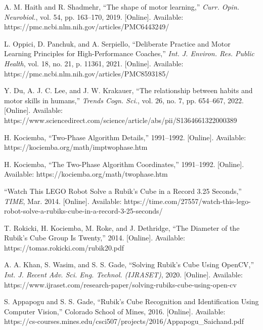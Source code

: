 
 \nocite{*}
 

\begin{thebibliography}{14}

A. M. Haith and R. Shadmehr, ``The shape of motor learning,'' \textit{Curr. Opin. Neurobiol.}, vol. 54, pp. 163--170, 2019. [Online]. Available: https://pmc.ncbi.nlm.nih.gov/articles/PMC6443249/

L. Oppici, D. Panchuk, and A. Serpiello, ``Deliberate Practice and Motor Learning Principles for High-Performance Coaches,'' \textit{Int. J. Environ. Res. Public Health}, vol. 18, no. 21, p. 11361, 2021. [Online]. Available: https://pmc.ncbi.nlm.nih.gov/articles/PMC8593185/

Y. Du, A. J. C. Lee, and J. W. Krakauer, ``The relationship between habits and motor skills in humans,'' \textit{Trends Cogn. Sci.}, vol. 26, no. 7, pp. 654--667, 2022. [Online]. Available: https://www.sciencedirect.com/science/article/abs/pii/S1364661322000389

H. Kociemba, ``Two-Phase Algorithm Details,'' 1991--1992. [Online]. Available: https://kociemba.org/math/imptwophase.htm

H. Kociemba, ``The Two-Phase Algorithm Coordinates,'' 1991--1992. [Online]. Available: https://kociemba.org/math/twophase.htm

``Watch This LEGO Robot Solve a Rubik's Cube in a Record 3.25 Seconds,'' \textit{TIME}, Mar. 2014. [Online]. Available: https://time.com/27557/watch-this-lego-robot-solve-a-rubiks-cube-in-a-record-3-25-seconds/

T. Rokicki, H. Kociemba, M. Roke, and J. Dethridge, ``The Diameter of the Rubik's Cube Group Is Twenty,'' 2014. [Online]. Available: https://tomas.rokicki.com/rubik20.pdf

A. A. Khan, S. Wasim, and S. S. Gade, ``Solving Rubik's Cube Using OpenCV,'' \textit{Int. J. Recent Adv. Sci. Eng. Technol. (IJRASET)}, 2020. [Online]. Available: https://www.ijraset.com/research-paper/solving-rubiks-cube-using-open-cv

S. Appapogu and S. S. Gade, ``Rubik's Cube Recognition and Identification Using Computer Vision,'' Colorado School of Mines, 2016. [Online]. Available: https://cs-courses.mines.edu/csci507/projects/2016/Appapogu\_Saichand.pdf


\end{thebibliography}
